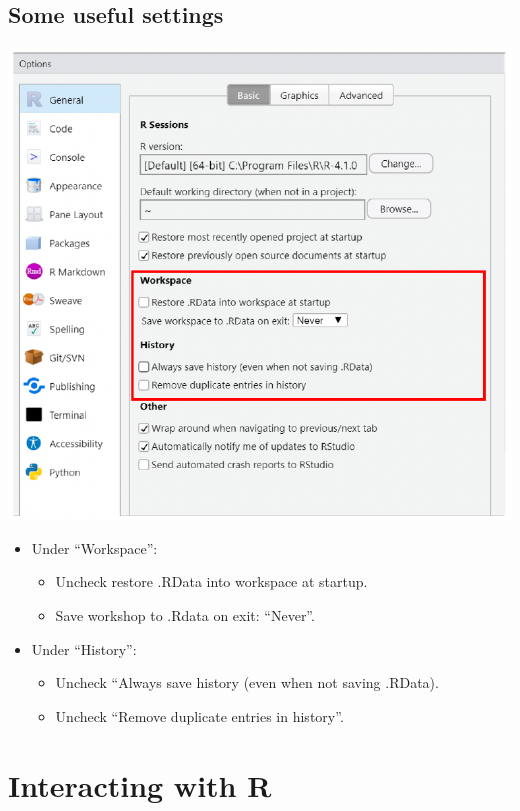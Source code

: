 \documentclass[
]{book}
\providecommand{\tightlist}{%
  \setlength{\itemsep}{0pt}\setlength{\parskip}{0pt}}
\begin{document}
\subsection{Some useful settings}\label{some-useful-settings}

\includegraphics{./img/useful_settings.png}

\begin{itemize}
\tightlist
\item
  Under ``Workspace'':

  \begin{itemize}
  \tightlist
  \item
    Uncheck restore .RData into workspace at startup.
  \item
    Save workshop to .Rdata on exit: ``Never''.
  \end{itemize}
\item
  Under ``History'':

  \begin{itemize}
  \tightlist
  \item
    Uncheck ``Always save history (even when not saving .RData).
  \item
    Uncheck ``Remove duplicate entries in history''.
  \end{itemize}
\end{itemize}

\section{Interacting with R}\label{interacting-with-r}
\end{document}
